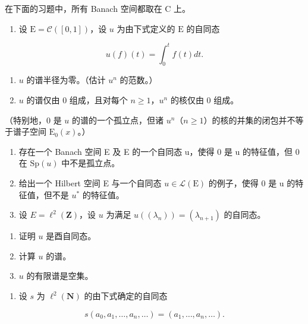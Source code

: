 
在下面的习题中，所有 Banach 空间都取在 C 上。

\begin{enumerate}
\def\labelenumi{\arabic{enumi})}
\tightlist
\item
  设 \(\mathrm{E} = \mathcal{C}([0,1])\)，设 \(u\) 为由下式定义的 \(\mathrm{E}\) 的自同态
\end{enumerate}

\[
u (f) (t) = \int_ {0} ^ {t} f (t) d t.
\]

\begin{enumerate}
\def\labelenumi{\alph{enumi})}
\item
  \(u\) 的谱半径为零。（估计 \(u^n\) 的范数。）
\item
  \(u\) 的谱仅由 0 组成，且对每个 \(n \geqslant 1\)，\(u^{n}\) 的核仅由 0 组成。
\end{enumerate}

（特别地，0 是 \(u\) 的谱的一个孤立点，但诸 \(u^n\)（\(n \geqslant 1\)）的核的并集的闭包并不等于谱子空间 \(\mathrm{E}_0(x)\)。）

\begin{enumerate}
\def\labelenumi{\arabic{enumi})}
\setcounter{enumi}{1}
\item
  存在一个 Banach 空间 E 及 E 的一个自同态 u，使得 0 是 u 的特征值，但 0 在 \(\mathrm{Sp}(u)\) 中不是孤立点。
\item
  给出一个 Hilbert 空间 E 与一个自同态 \(u \in \mathcal{L}(\mathrm{E})\) 的例子，使得 0 是 u 的特征值，但不是 \(u^{*}\) 的特征值。
\item
  设 \(E = \ell^{2}(\mathbf{Z})\)，设 \(u\) 为满足 \(u((\lambda_{n})) = (\lambda_{n+1})\) 的自同态。
\end{enumerate}

\begin{enumerate}
\def\labelenumi{\alph{enumi})}
\item
  证明 \(u\) 是酉自同态。
\item
  计算 \(u\) 的谱。
\item
  \(u\) 的有限谱是空集。
\end{enumerate}

\begin{enumerate}
\def\labelenumi{\arabic{enumi})}
\setcounter{enumi}{4}
\tightlist
\item
  设 \(s\) 为 \(\ell^2 (\mathbf{N})\) 的由下式确定的自同态
\end{enumerate}

\[
s (a _ {0}, a _ {1}, \dots , a _ {n}, \dots) = (a _ {1}, \dots , a _ {n}, \dots).
\]

